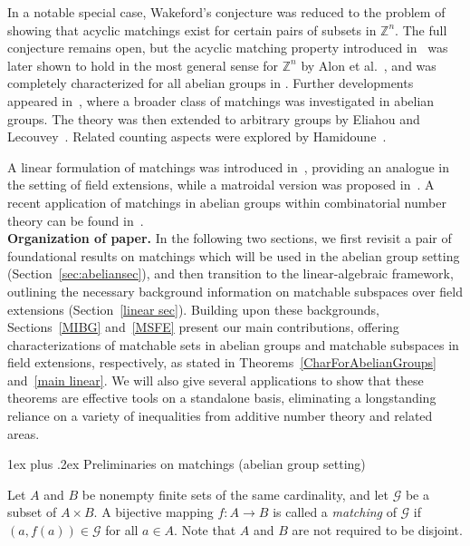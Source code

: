\documentclass[11pt]{amsart}
\makeatletter
\def\subsection{\@startsection{subsection}{2}%
  \z@{1.5ex plus .2ex minus .2ex}%
  {1ex plus .2ex}%
  {\normalfont\bfseries}}
\theoremstyle{definition}
\theoremstyle{remark}
\makeatother
\begin{document}
In a notable special case, Wakeford's conjecture was reduced to the problem of showing that acyclic matchings exist for certain pairs of subsets in \( \mathbb{Z}^n \). The full conjecture remains open, but the acyclic matching property introduced in~\cite{Losonczy 1} was later shown to hold in the most general sense for \( \mathbb{Z}^n \) by Alon et al.~\cite{Alon}, and was completely characterized for all abelian groups in \cite{Taylor}. Further developments appeared in~\cite{Losonczy 2}, where a broader class of matchings was investigated in abelian groups.  The theory was then extended to arbitrary groups by Eliahou and Lecouvey~\cite{Eliahou 1}. Related counting aspects were explored by Hamidoune~\cite{Hamidoune}.

A linear formulation of matchings was introduced in~\cite{Eliahou 2}, providing an analogue in the setting of field extensions, while a matroidal version was proposed in~\cite{Aliabadi 3}. A recent application of matchings in abelian groups within combinatorial number theory can be found in~\cite{Lev}.\\

\textbf{Organization of paper.} In the following two sections, we first revisit a pair of foundational results on matchings which will be used in the abelian group setting (Section~\ref{sec:abeliansec}), and then transition to the linear-algebraic framework, outlining the necessary background information on matchable subspaces over field extensions (Section~\ref{linear sec}). Building upon these backgrounds, Sections~\ref{MIBG} and~\ref{MSFE} present our main contributions, offering characterizations of matchable sets in abelian groups and matchable subspaces in field extensions, respectively, as stated in Theorems~\ref{CharForAbelianGroups} and~\ref{main linear}. We will also give several applications to show that these theorems are effective tools on a standalone basis, eliminating a longstanding reliance on a variety of inequalities from additive number theory and related areas.


\subsection{Preliminaries on matchings (abelian group setting)}\label{sec:abeliansec}

Let \( A \) and \( B \) be nonempty finite sets of the same cardinality, and let \( \mathcal{G} \) be a subset of \( A \times B \). A bijective mapping \( f : A \longrightarrow B \) is called a {\em matching} of \( \mathcal{G} \) if \( (a, f(a)) \in \mathcal{G} \) for all \( a \in A \).  Note that \( A \) and \( B \) are not required to be disjoint.
\end{document}
